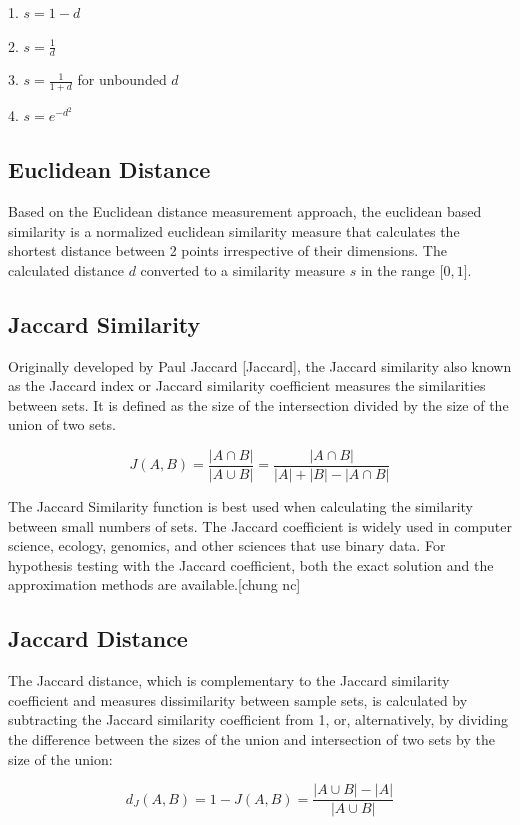 1. $s=1-d$

2. $s=\frac{1}{d}$

3. $s=\frac{1}{1+d}$ for unbounded $d$

4. $s=e^{-d^{2}}$

\subsection{Euclidean Distance}
Based on the Euclidean distance measurement approach, the euclidean based similarity  is a normalized euclidean similarity measure that calculates the shortest distance between 2 points irrespective of their dimensions.  The calculated distance $d$ converted to a similarity measure $s$ in the range $\mathrm[0, 1]$.

\subsection{Jaccard Similarity}
Originally developed by Paul Jaccard [Jaccard], the Jaccard similarity also known as the Jaccard index or Jaccard similarity coefficient measures the similarities between sets. It is defined as the size of the intersection divided by the size of the union of two sets.

\begin{equation}
J(A, B)=\frac{|A \cap B|}{|A \cup B|}=\frac{|A \cap B|}{|A|+|B|-|A \cap B|}
\end{equation}

The Jaccard Similarity function is best used when calculating the similarity between small numbers of sets. The Jaccard coefficient is widely used in computer science, ecology, genomics, and other sciences that use binary data.  For hypothesis testing with the Jaccard coefficient, both the exact solution and the approximation methods are available.[chung nc]


\subsection{Jaccard Distance}
The Jaccard distance, which is complementary to the Jaccard similarity coefficient and measures dissimilarity between sample sets, is calculated by subtracting the Jaccard similarity coefficient from 1, or, alternatively, by dividing the difference between the sizes of the union and intersection of two sets by the size of the union:

\begin{equation}
d_{J}(A, B)=1-J(A, B)=\frac{|A \cup B|-|A|}{|A \cup B|}
\end{equation}

